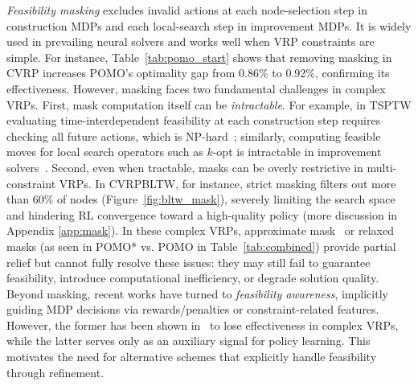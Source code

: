 \documentclass{article} %
\begin{document}
\emph{Feasibility masking} excludes invalid actions at each node-selection step in construction MDPs and each local-search step in improvement MDPs. It is widely used in prevailing neural solvers and works well when VRP constraints are simple. For instance, Table~\ref{tab:pomo_start} shows that removing masking in CVRP increases POMO’s optimality gap from 0.86\% to 0.92\%, confirming its effectiveness. However, masking faces two fundamental challenges in complex VRPs. First, mask computation itself can be \emph{intractable}. For example, in TSPTW evaluating time-interdependent feasibility at each construction step requires checking all future actions, which is NP-hard~\citep{bi2024learning}; similarly, computing feasible moves for local search operators such as $k$-opt is intractable in improvement solvers~\citep{ma2023learning}. Second, even when tractable, masks can be overly restrictive in multi-constraint VRPs. {In CVRPBLTW, for instance, strict masking filters out more than 60\% of nodes (Figure~\ref{fig:bltw_mask}), severely limiting the search space and hindering RL convergence toward a high-quality policy (more discussion in Appendix \ref{app:mask})}. In these complex VRPs, approximate mask~\citep{bi2024learning} or relaxed masks (as seen in POMO* vs. POMO in Table~\ref{tab:combined}) provide partial relief but cannot fully resolve these issues: they may still fail to guarantee feasibility, introduce computational inefficiency, or degrade solution quality. Beyond masking, recent works have turned to \emph{feasibility awareness}, implicitly guiding MDP decisions via rewards/penalties or constraint-related features. {However, the former has been shown in~\citet{bi2024learning} to lose effectiveness in complex VRPs, while the latter serves only as an auxiliary signal for policy learning. This motivates the need for alternative schemes that explicitly handle feasibility through refinement.}

\end{document}
